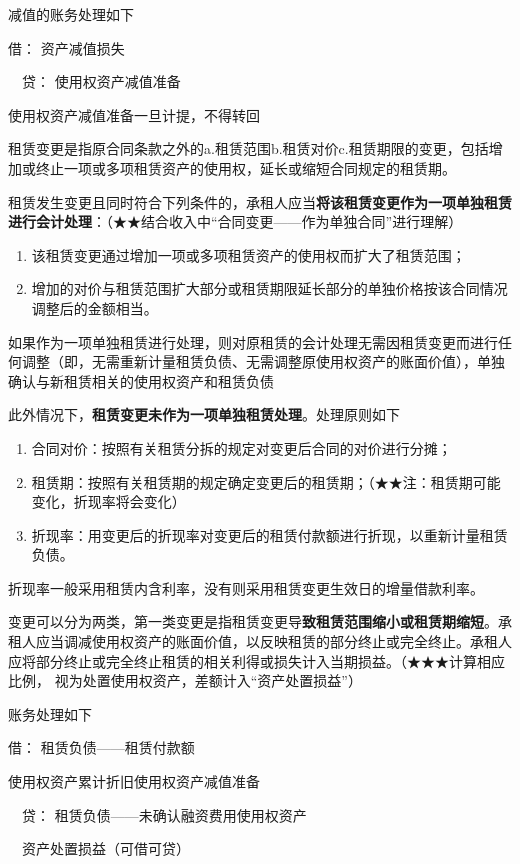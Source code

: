 \documentclass[UTF8,12pt]{ctexart}
\newenvironment{Dr}{\noindent 借：}{\par}
\newenvironment{Cr}{\noindent \ \ 贷：}{\par}
\numberwithin{equation}{section} %
\numberwithin{figure}{section}
\numberwithin{table}{section}
\begin{document}
	减值的账务处理如下
	
	\begin{Dr}
		资产减值损失
	\end{Dr}
	\begin{Cr}
		使用权资产减值准备
	\end{Cr}
	使用权资产减值准备一旦计提，不得转回
	
	租赁变更是指原合同条款之外的a.租赁范围b.租赁对价c.租赁期限的变更，包括增加或终止一项或多项租赁资产的使用权，延长或缩短合同规定的租赁期。
	
	租赁发生变更且同时符合下列条件的，承租人应当\textbf{将该租赁变更作为一项单独租赁进行会计处理}：（★★结合收入中“合同变更——作为单独合同”进行理解）
	\begin{enumerate}
		\item 该租赁变更通过增加一项或多项租赁资产的使用权而扩大了租赁范围；
		
		\item 增加的对价与租赁范围扩大部分或租赁期限延长部分的单独价格按该合同情况调整后的金额相当。
	\end{enumerate}

	如果作为一项单独租赁进行处理，则对原租赁的会计处理无需因租赁变更而进行任何调整（即，无需重新计量租赁负债、无需调整原使用权资产的账面价值），单独确认与新租赁相关的使用权资产和租赁负债
	
	此外情况下，\textbf{租赁变更未作为一项单独租赁处理}。处理原则如下
	\begin{enumerate}
		\item 合同对价：按照有关租赁分拆的规定对变更后合同的对价进行分摊；
		
		\item 租赁期：按照有关租赁期的规定确定变更后的租赁期；（★★注：租赁期可能变化，折现率将会变化）
		
		\item 折现率：用变更后的折现率对变更后的租赁付款额进行折现，以重新计量租赁负债。
	\end{enumerate}
	折现率一般采用租赁内含利率，没有则采用租赁变更生效日的增量借款利率。
	
	变更可以分为两类，第一类变更是指租赁变更导\textbf{致租赁范围缩小或租赁期缩短}。承租人应当调减使用权资产的账面价值，以反映租赁的部分终止或完全终止。承租人应将部分终止或完全终止租赁的相关利得或损失计入当期损益。（★★★计算相应比例， 视为处置使用权资产，差额计入“资产处置损益”）
	
	账务处理如下
	
	\begin{Dr}
		租赁负债——租赁付款额
		
		使用权资产累计折旧使用权资产减值准备
	\end{Dr}
	\begin{Cr}
		租赁负债——未确认融资费用使用权资产
		
		\ \ 资产处置损益（可借可贷）
	\end{Cr}
	
\end{document}

